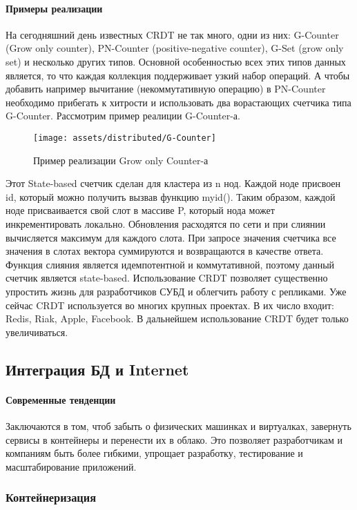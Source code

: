 \paragraph{Примеры реализации}
На сегодняшний день известных CRDT не так много, одни из них: G-Counter (Grow only counter), PN-Counter (positive-negative counter), G-Set (grow only set) и несколько других типов. Основной особенностью всех этих типов данных является, то что каждая коллекция поддерживает узкий набор операций. А чтобы добавить например вычитание (некоммутативную операцию) в PN-Counter необходимо прибегать к хитрости и использовать два ворастающих счетчика типа G-Counter. Рассмотрим пример реалиции G-Counter-а. 
\begin{figure}[H]
    \centering
    \texttt{[image: assets/distributed/G-Counter]}
    \caption{Пример реализации Grow only Counter-а}
    \label{fig:G-Counter}
\end{figure}
Этот State-based счетчик сделан для кластера из n нод. Каждой ноде присвоен id, который можно получить вызвав функцию myid(). Таким образом, каждой ноде присваивается свой слот в массиве P, который нода может инкрементировать локально. Обновления расходятся по сети и при слиянии вычисляется максимум для каждого слота. При запросе значения счетчика все значения в слотах вектора суммируются и возвращаются в качестве ответа. Функция слияния является идемпотентной и коммутативной, поэтому данный счетчик является state-based.
Использование CRDT позволяет существенно упростить жизнь для разработчиков СУБД и облегчить работу с репликами. Уже сейчас CRDT используется во многих крупных проектах. В их число входит: Redis, Riak, Apple, Facebook. В дальнейшем использование CRDT будет только увеличиваться. 

\subsection{Интеграция БД и Internet}
\paragraph{Современные тенденции}
Заключаются в том, чтоб забыть о физических машинках и виртуалках, завернуть сервисы в контейнеры и перенести их в облако. Это позволяет разработчикам и компаниям быть более гибкими, 
упрощает разработку, тестирование и масштабирование приложений.

\subsubsection{Контейнеризация}

